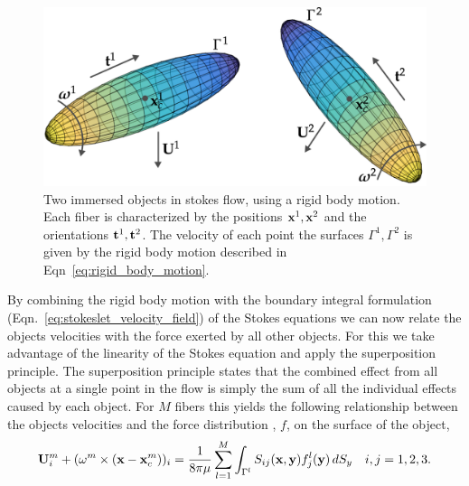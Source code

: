 \begin{figure}[!htbp]
  \centering
  \includegraphics[width=.8\textwidth]{img/immersed_rigid.png}
  \caption[Two immersed objects in stokes flow.]{Two immersed objects in stokes flow, using a rigid body motion. Each fiber is characterized by the positions $\mathbf{x}^1, \mathbf{x}^2$ and the orientations $\mathbf{t}^1,\mathbf{t}^2$. The velocity of each point the surfaces $\Gamma^1, \Gamma^2$ is given by the rigid body motion described in Eqn~\eqref{eq:rigid_body_motion}.}
  \label{fig:immersed_rigid}
\end{figure}

By combining the rigid body motion with the boundary integral formulation (Eqn.~\eqref{eq:stokeslet_velocity_field}) of the Stokes equations we can now relate the objects velocities with the force exerted by all other objects. For this we take advantage of the linearity of the Stokes equation and apply the superposition principle. The superposition principle states that the combined effect from all objects at a single point in the flow is simply the sum of all the individual effects caused by each object. For $M$ fibers this yields the following relationship between the objects velocities and the force distribution , $f$, on the surface of the object,
\begin{equation}
  \label{eq:objects_boundary}
	\mathbf{U}_i^m + (\mathbf{\omega}^m \times (\mathbf{x} - \mathbf{x}_c^m))_i = \frac{1}{8 \pi \mu} \sum_{l=1}^{M} \int_{\Gamma^l} S_{ij}(\mathbf{x},\mathbf{y})f_j^l(\mathbf{y}) \, dS_y \quad i,j =1,2,3 \text{.}
\end{equation}

